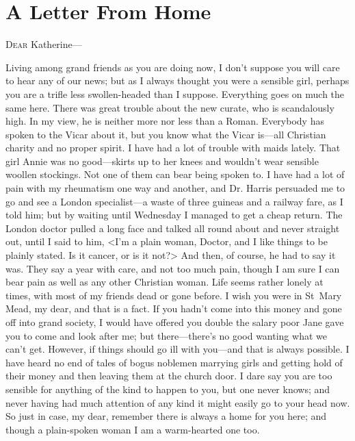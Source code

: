 \chapter{A Letter From Home}


\lettrine{D}{ear} Katherine—

\begin{mail}{}{}
Living among grand friends as you are doing now, I don't suppose you will care to hear any of our news; but as I always thought you were a sensible girl, perhaps you are a trifle less swollen-headed than I suppose. Everything goes on much the same here. There was great trouble about the new curate, who is scandalously high. In my view, he is neither more nor less than a Roman. Everybody has spoken to the Vicar about it, but you know what the Vicar is—all Christian charity and no proper spirit. I have had a lot of trouble with maids lately. That girl Annie was no good—skirts up to her knees and wouldn't wear sensible woollen stockings. Not one of them can bear being spoken to. I have had a lot of pain with my rheumatism one way and another, and Dr. Harris persuaded me to go and see a London specialist—a waste of three guineas and a railway fare, as I told him; but by waiting until Wednesday I managed to get a cheap return. The London doctor pulled a long face and talked all round about and never straight out, until I said to him, <I'm a plain woman, Doctor, and I like things to be plainly stated. Is it cancer, or is it not?> And then, of course, he had to say it was. They say a year with care, and not too much pain, though I am sure I can bear pain as well as any other Christian woman. Life seems rather lonely at times, with most of my friends dead or gone before. I wish you were in St~Mary Mead, my dear, and that is a fact. If you hadn't come into this money and gone off into grand society, I would have offered you double the salary poor Jane gave you to come and look after me; but there—there's no good wanting what we can't get. However, if things should go ill with you—and that is always possible. I have heard no end of tales of bogus noblemen marrying girls and getting hold of their money and then leaving them at the church door. I dare say you are too sensible for anything of the kind to happen to you, but one never knows; and never having had much attention of any kind it might easily go to your head now. So just in case, my dear, remember there is always a home for you here; and though a plain-spoken woman I am a warm-hearted one too.


\end{mail}

